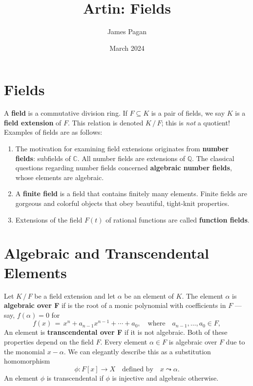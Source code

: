\documentclass[11pt]{article}
\title{Artin: Fields}
\author{James Pagan}
\date{March 2024}
\begin{document}
\maketitle
\tableofcontents
\newpage


\section{Fields}

A \textbf{field} is a commutative division ring. If $F \subseteq K$ is a pair of fields, we say $K$ is a \textbf{field extension} of $F$. This relation is denoted $K \, / \, F$; this is \textit{not} a quotient! Examples of fields are as follows:
\begin{enumerate}
  \item The motivation for examining field extensions originates from \textbf{number fields}: subfields of $\mathbb{C}$. All number fields are extensions of $\mathbb{Q}$. The classical questions regarding number fields concerned \textbf{algebraic number fields}, whose elements are algebraic.
  \item A \textbf{finite field} is a field that contains finitely many elements. Finite fields are gorgeous and colorful objects that obey beautiful, tight-knit properties.
  \item Extensions of the field $F(t)$ of rational functions are called \textbf{function fields}.
\end{enumerate}


\section{Algebraic and Transcendental Elements}

Let $K \, / \, F$ be a field extension and let $\alpha$ be an element of $K$. The element $\alpha$ is \textbf{algebraic over F} if is the root of a monic polynomial with coefficients in $F$ --- say, $f(\alpha) = 0$ for
\[
  f(x) \, = \, x^{n} + a_{n - 1}x^{n - 1} + \cdots + a_{0}, \quad \text{where} \quad a_{n - 1}, \ldots, a_{0} \in F,
\]
An element is \textbf{transcendental over F} if it is not algebraic. Both of these properties depend on the field $F$. Every element $\alpha \in F$ is algebraic over $F$ due to the monomial $x - \alpha$. We can elegantly describe this as a substitution homomorphism
\[
  \phi : F[x] \to X \quad \text{defined by} \quad x \leadsto \alpha.
\]
An element $\phi$ is transcendental if $\phi$ is injective and algebraic otherwise.
\end{document}
